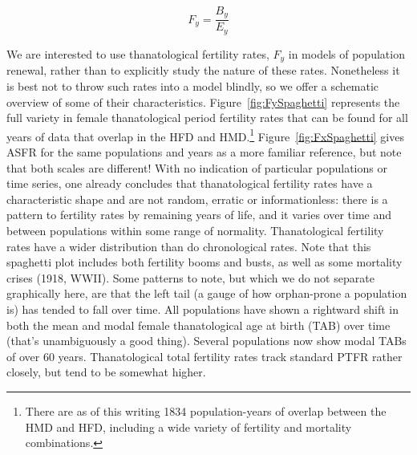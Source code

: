 \documentclass{article}
\begin{document}
\begin{equation}
F_y = \frac{B_y}{E_y}
\end{equation}

We are interested to use thanatological fertility rates, $F_y$ in
models of population renewal, rather than to explicitly study the nature of these rates.
Nonetheless it is best not to throw such rates into a model blindly, so we
offer a schematic overview of some of their characteristics.
Figure~\ref{fig:FySpaghetti} represents the full variety in
female thanatological period fertility rates that can be found for all years
of data that overlap in the HFD and HMD.\footnote{There are as of this writing
1834 population-years of overlap between the HMD and HFD, including a wide
variety of fertility and mortality combinations.} Figure~\ref{fig:FxSpaghetti} gives ASFR for the same
populations and years as a more familiar reference, but note that both scales are different! With no indication of particular populations or time series, one already concludes that thanatological fertility rates have a characteristic shape and are not random, erratic or informationless: there is a pattern to fertility rates by remaining years of life, and it varies over time and between populations within some range of normality. Thanatological fertility rates have a wider distribution than do chronological rates. Note that this spaghetti plot includes both fertility booms and busts, as
well as some mortality crises (1918, WWII). Some patterns to note, but which we
do not separate graphically here, are that the left tail (a gauge of how
orphan-prone a population is) has tended to fall over time. All populations have
shown a rightward shift in both the mean and modal female thanatological age at
birth (TAB) over time (that's unambiguously a good thing). Several populations
now show modal TABs of over 60 years. Thanatological total fertility rates track
standard PTFR rather closely, but tend to be somewhat higher.
\end{document}
